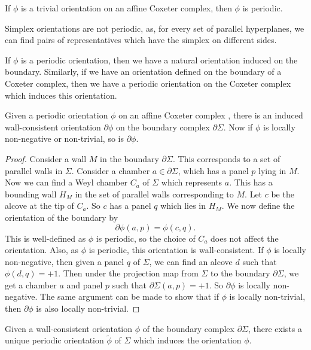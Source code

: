 \documentclass[11pt]{article}
\begin{document}
\begin{example}
    If $\phi$ is a trivial orientation on an affine Coxeter complex, then $\phi$ is periodic. 
\end{example}

\begin{example}
    Simplex orientations are not periodic, as, for every set of parallel hyperplanes, we can find pairs of representatives which have the simplex on different sides.
\end{example}

If $\phi$ is a periodic orientation, then we have a natural orientation induced on the boundary. Similarly, if we have an orientation defined on the boundary of a Coxeter complex, then we have a periodic orientation on the Coxeter complex which induces this orientation. 

\begin{lemma}\cite[p.125]{SHA}
    Given a periodic orientation $\phi$ on an affine Coxeter complex \sg, there is an induced wall-consistent orientation $\partial\phi$ on the boundary complex $\partial\Sigma$. Now if $\phi$ is locally non-negative or non-trivial, so is $\partial\phi$. 
\end{lemma}

\begin{proof}
    Consider a wall $M$ in the boundary $\partial\Sigma$. This corresponds to a set of parallel walls in $\Sigma$. Consider a chamber $a\in \partial\Sigma$, which has a panel $p$ lying in $M$. Now we can find a Weyl chamber $C_a$ of $\Sigma$ which represents $a$. This has a bounding wall $H_M$ in the set of parallel walls corresponding to $M$. Let $c$ be the alcove at the tip of $C_a$. So $c$ has a panel $q$ which lies in $H_M$. We now define the orientation of the boundary by 
    \[\partial \phi (a,p)= \phi (c,q).\]
    This is well-defined as $\phi$ is periodic, so the choice of $C_a$ does not affect the orientation. Also, as $\phi$ is periodic, this orientation is wall-consistent. 
    If $\phi$ is locally non-negative, then given a panel $q$ of $\Sigma$, we can find an alcove $d$ such that $\phi(d,q)=+1$. Then under the projection map from $\Sigma$ to the boundary $\partial\Sigma$, we get a chamber $a$ and panel $p$ such that $\partial\Sigma(a,p)=+1$. So $\partial\phi$ is locally non-negative. The same argument can be made to show that if $\phi$ is locally non-trivial, then $\partial\phi$ is also locally non-trivial. 
\end{proof}


\begin{lemma}
    Given a wall-consistent orientation $\phi$ of the boundary complex $\partial\Sigma$, there exists a unique periodic orientation $\tilde{\phi}$ of $\Sigma$ which induces the orientation $\phi$. 
\end{lemma}
\end{document}
